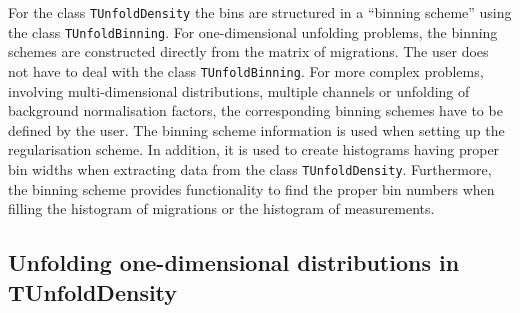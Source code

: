 \documentclass[12pt]{article}
\begin{document}
For the class {\tt TUnfoldDensity} the bins are structured in a
``binning scheme'' using the class {\tt TUnfoldBinning}.
For one-dimensional unfolding problems, the binning schemes are constructed
directly from the matrix of migrations. The user does not have to deal
with the class {\tt TUnfoldBinning}. For more complex problems,
involving multi-dimensional distributions, multiple channels or
unfolding of background normalisation factors,
the corresponding binning schemes have to be defined by the user.
The binning scheme information is used when setting
up the regularisation scheme. In addition, it is used to
create histograms having proper bin widths when extracting
data from the class {\tt TUnfoldDensity}. Furthermore, the binning
scheme provides functionality to find the proper bin numbers when
filling the histogram of migrations or the histogram of measurements.

\subsection{Unfolding one-dimensional distributions in TUnfoldDensity}
\end{document}
